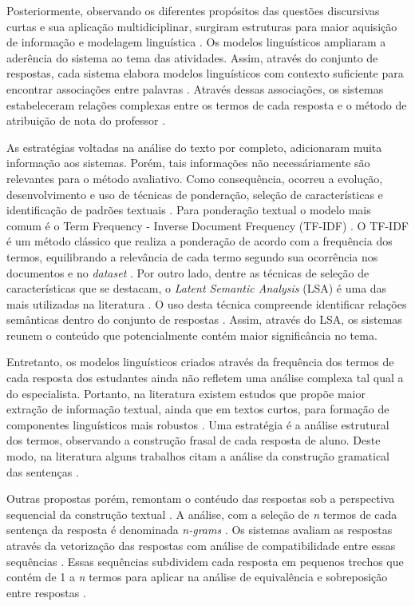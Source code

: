 Posteriormente, observando os diferentes propósitos das questões discursivas curtas e sua aplicação multidiciplinar, surgiram estruturas para maior aquisição de informação e modelagem linguística \cite{kumar2019, saha2018}. Os modelos linguísticos ampliaram a aderência do sistema ao tema das atividades. Assim, através do conjunto de respostas, cada sistema elabora modelos linguísticos com contexto suficiente para encontrar associações entre palavras \cite{tan2020}. Através dessas associações, os sistemas estabeleceram relações complexas entre os termos de cada resposta e o método de atribuição de nota do professor \cite{sahu2020}.

As estratégias voltadas na análise do texto por completo, adicionaram muita informação aos sistemas. Porém, tais informações não necessáriamente são relevantes para o método avaliativo. Como consequência, ocorreu a evolução, desenvolvimento e uso de técnicas de ponderação, seleção de características e identificação de padrões textuais \cite{banjade2016}. Para ponderação textual o modelo mais comum é o Term Frequency - Inverse Document Frequency (TF-IDF) \cite{baeza2011}. O TF-IDF é um método clássico que realiza a ponderação de acordo com a frequência dos termos, equilibrando a relevância de cada termo segundo sua ocorrência nos documentos e no \textit{dataset} \cite{sultan2016}. Por outro lado, dentre as técnicas de seleção de características que se destacam, o \textit{Latent Semantic Analysis} (LSA) \cite{landauer1998} é uma das mais utilizadas na literatura \cite{basu2013, sahu2020}. O uso desta técnica compreende identificar relações semânticas dentro do conjunto de respostas \cite{mohler2009}. Assim, através do LSA, os sistemas reunem o conteúdo que potencialmente contém maior significância no tema.

Entretanto, os modelos linguísticos criados através da frequência dos termos de cada resposta dos estudantes ainda não refletem uma análise complexa tal qual a do especialista. Portanto, na literatura existem estudos que propõe maior extração de informação textual, ainda que em textos curtos, para formação de componentes linguísticos mais robustos \cite{saha2018, zesch2018}. Uma estratégia é a análise estrutural dos termos, observando a construção frasal de cada resposta de aluno. Deste modo, na literatura alguns trabalhos citam a análise da construção gramatical das sentenças \cite{ramachandran2015b, roy2016}.

Outras propostas porém, remontam o contéudo das respostas sob a perspectiva sequencial da construção textual \cite{kumar2017}. A análise, com a seleção de \textit{n} termos de cada sentença da resposta é denominada \textit{n-grams} \cite{manning1999}. Os sistemas avaliam as respostas através da vetorização das respostas com análise de compatibilidade entre essas sequências \cite{sakaguchi2015, sultan2016}. Essas sequências subdividem cada resposta em pequenos trechos que contém de 1 a \textit{n} termos para aplicar na análise de equivalência e sobreposição entre respostas \cite{jimenez2013}. 

